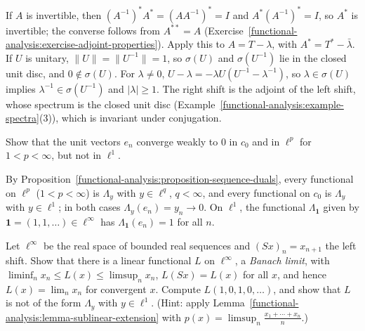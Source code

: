 \begin{solution}
If $A$ is invertible, then $(A^{-1})^*A^* = (AA^{-1})^* = I$ and $A^*(A^{-1})^* = I$, so $A^*$ is invertible; the converse follows from $A^{**} = A$ (Exercise~\ref{functional-analysis:exercise-adjoint-properties}).
Apply this to $A = T - \lambda$, with $A^* = T^* - \bar\lambda$. If $U$ is unitary, $\|U\| = \|U^{-1}\| = 1$, so $\sigma(U)$ and $\sigma(U^{-1})$ lie in the closed unit disc, and $0 \notin \sigma(U)$. For $\lambda \neq 0$,
$U - \lambda = -\lambda U(U^{-1} - \lambda^{-1})$, so $\lambda \in \sigma(U)$ implies $\lambda^{-1} \in \sigma(U^{-1})$ and $|\lambda| \geq 1$. The right shift is the adjoint of the left shift, whose spectrum is the closed unit
disc (Example~\ref{functional-analysis:example-spectra}(3)), which is invariant under conjugation.
\end{solution}

\begin{exercise}\label{functional-analysis:exercise-weak-unit-vectors}
Show that the unit vectors $e_n$ converge weakly to $0$ in $c_0$ and in $\ell^p$ for $1 < p < \infty$, but not in $\ell^1$.
\end{exercise}

\begin{solution}
By Proposition~\ref{functional-analysis:proposition-sequence-duals}, every functional on $\ell^p$ ($1 < p < \infty$) is $\Lambda_y$ with $y \in \ell^q$, $q < \infty$, and every functional on $c_0$ is $\Lambda_y$ with $y \in \ell^1$; in both
cases $\Lambda_y(e_n) = y_n \to 0$. On $\ell^1$, the functional $\Lambda_{\mathbf{1}}$ given by $\mathbf{1} = (1, 1, \ldots) \in \ell^\infty$ has $\Lambda_{\mathbf{1}}(e_n) = 1$ for all $n$.
\end{solution}

\begin{exercise}\label{functional-analysis:exercise-banach-limit}
Let $\ell^\infty$ be the real space of bounded real sequences and $(Sx)_n = x_{n+1}$ the left shift. Show that there is a linear functional $L$ on $\ell^\infty$, a \emph{Banach limit}, with
$\liminf_nx_n \leq L(x) \leq \limsup_nx_n$, $L(Sx) = L(x)$ for all $x$, and hence $L(x) = \lim_nx_n$ for convergent $x$. Compute $L(1, 0, 1, 0, \ldots)$, and show that $L$ is not of the form $\Lambda_y$ with
$y \in \ell^1$. (Hint: apply Lemma~\ref{functional-analysis:lemma-sublinear-extension} with $p(x) = \limsup_n\frac{x_1 + \cdots + x_n}{n}$.)
\end{exercise}

